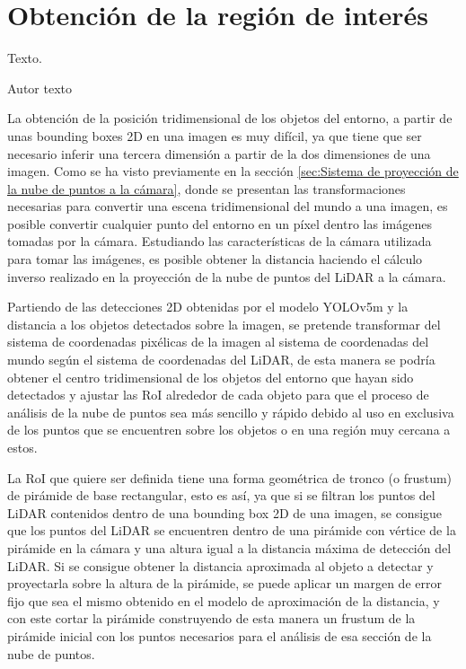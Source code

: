 \chapter{Obtención de la región de interés}
\label{cha:Obtención de la región de interés}

\begin{FraseCelebre}
  \begin{Frase}
    Texto.
  \end{Frase}
  \begin{Fuente}
    Autor texto
  \end{Fuente}
\end{FraseCelebre}

\noindent
La obtención de la posición tridimensional de los objetos del entorno, a partir de unas bounding boxes 2D en una imagen es muy difícil, ya que tiene que ser necesario inferir una tercera dimensión a partir de la dos dimensiones de una imagen. Como se ha visto previamente en la sección \ref{sec:Sistema de proyección de la nube de puntos a la cámara}, donde se presentan las transformaciones necesarias para convertir una escena tridimensional del mundo a una imagen, es posible convertir cualquier punto del entorno en un píxel dentro las imágenes tomadas por la cámara. Estudiando las características de la cámara utilizada para tomar las imágenes, es posible obtener la distancia haciendo el cálculo inverso realizado en la proyección de la nube de puntos del \ac{LiDAR} a la cámara.

Partiendo de las detecciones 2D obtenidas por el modelo YOLOv5m y la distancia a los objetos detectados sobre la imagen, se pretende transformar del sistema de coordenadas pixélicas de la imagen al sistema de coordenadas del mundo según el sistema de coordenadas del \ac{LiDAR}, de esta manera se podría obtener el centro tridimensional de los objetos del entorno que hayan sido detectados y ajustar las \ac{RoI} alrededor de cada objeto para que el proceso de análisis de la nube de puntos sea más sencillo y rápido debido al uso en exclusiva de los puntos que se encuentren sobre los objetos o en una región muy cercana a estos.

La \ac{RoI} que quiere ser definida tiene una forma geométrica de tronco (o frustum) de pirámide de base rectangular, esto es así, ya que si se filtran los puntos del \ac{LiDAR} contenidos dentro de una bounding box 2D de una imagen, se consigue que los puntos del \ac{LiDAR} se encuentren dentro de una pirámide con vértice de la pirámide en la cámara y una altura igual a la distancia máxima de detección del \ac{LiDAR}. Si se consigue obtener la distancia aproximada al objeto a detectar y proyectarla sobre la altura de la pirámide, se puede aplicar un margen de error fijo que sea el mismo obtenido en el modelo de aproximación de la distancia, y con este cortar la pirámide construyendo de esta manera un frustum de la pirámide inicial con los puntos necesarios para el análisis de esa sección de la nube de puntos.

